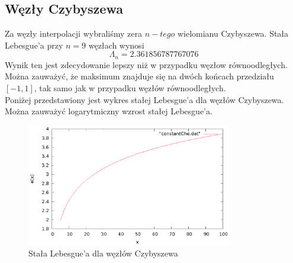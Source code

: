 \documentclass{article}
\begin{document}
\subsection{Węzły Czybyszewa}

Za węzły interpolacji wybraliśmy zera $n-tego$ wielomianu Czybyszewa. Stała Lebesgue'a przy $n = 9$ węzłach wynosi
\begin{equation*}
\Lambda_n = 2.361856787767076
\end{equation*}
Wynik ten jest zdecydowanie lepszy niż w przypadku węzłow równoodległych. Można zauważyć, że maksimum znajduje się na dwóch końcach przedziału $[-1, 1]$, tak samo jak w przypadku węzłów równoodległych.\\
Poniżej przedstawiony jest wykres stałej Lebesgue'a dla węzłów Czybyszewa. Można zauważyć logarytmiczny wzrost stałej Lebesgue'a.
\begin{figure}
    \centering
    \includegraphics[width=0.8\textwidth]{wykresy/constantChe.eps}
    \caption{Stała Lebesgue'a dla węzłów Czybyszewa}
\end{figure}
\end{document}
